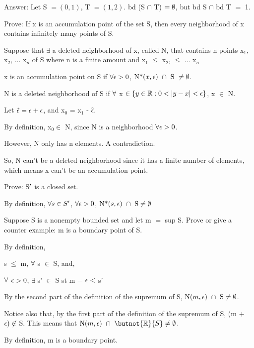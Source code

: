\documentclass{article}
\begin{document}
	Answer: Let S $= (0, 1)$, T $= (1, 2)$. bd (S $\cap$ T) $= \emptyset$, but bd S $\cap$ bd T $=$ 1.
\elist

 Prove: If x is an accumulation point of the set S, then every neighborhood of x contains infinitely many points of S.\

\bgpf
Suppose that $\exists$ a deleted neighborhood of x, called N, that contains n points x$_1$, x$_2$, ... x$_n$ of S where n is a finite amount and x$_1$ $\leq$ x$_2$, $\leq$  ... x$_n$ \

x is an accumulation point on S if $\forall \epsilon > 0$, $\textrm{N*(}x, \epsilon\textrm{) }\cap \textrm{ S	} \neq \emptyset$. \

N is a deleted neighborhood of S if $\forall$ x $\in \{y \in \mathbb{R} : 0 < |y - x| < \epsilon\}$, x $\in$ N.\

Let $\hat\epsilon = \epsilon + \epsilon$, and x$_0$ = x$_1$ - $\hat\epsilon$. \

By definition, x$_0 \in$ N, since N is a neighborhood $\forall \epsilon > 0$.\

However, N only has n elements. A contradiction.\

So, N can't be a deleted neighborhood since it has a finite number of elements, which means x can't be an accumulation point.

\epf
 

 Prove: S$^\prime$ is a closed set.

\bgpf

By definition, $\forall s \in S^\prime$, $\forall \epsilon > 0$, $\textrm{N*(}s, \epsilon\textrm{) }\cap \textrm{ S} \neq \emptyset$




\epf

 Suppose S is a nonempty bounded set and let m $=$ sup S. Prove or give a counter example: m is a boundary point of S.

\bgpf

By definition,

s $\leq$ m, $\forall$ s $\in$ S, and,

$\forall$ $\epsilon > 0$, $\exists$ s' $\in$ S st m $-$ $\epsilon <$ s'

By the second part of the definition of the supremum of S, $\textrm{N(}m, \epsilon\textrm{) }\cap \textrm{ S} \neq \emptyset$.

Notice also that, by the first part of the definition of the supremum of S, (m $+$ $\epsilon) \not\in$ S. This means that $\nbho{m}{\epsilon}{$\butnot{\br}{S}$}$.

By definition, m is a boundary point.
\end{document}
